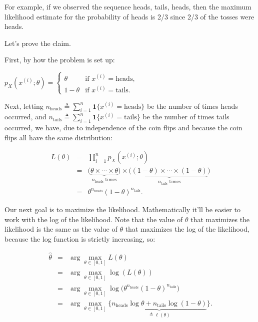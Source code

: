 \documentclass[6008notes.tex]{subfiles}
\begin{document}
For example, if we observed the sequence heads, tails, heads, then the maximum likelihood estimate for the probability of heads is 2/3 since 2/3 of the tosses were heads.

Let's prove the claim.

First, by how the problem is set up:

{\centering$p_{X}(x^{(i)};\theta)=\begin{cases}
\theta & \text{if }x^{(i)}=\text{heads},\\
1-\theta & \text{if }x^{(i)}=\text{tails}.
\end{cases}$ \par}

Next, letting $n_{\text {heads}}\triangleq \sum _{i=1}^{n}\mathbf{1}\{ x^{(i)}=\text {heads}\}$ be the number of times heads occurred, and $n_{\text {tails}}\triangleq \sum _{i=1}^{n}\mathbf{1}\{ x^{(i)}=\text {tails}\}$ be the number of times tails occurred, we have, due to independence of the coin flips and because the coin flips all have the same distribution:

\begin{eqnarray*}
L(\theta)
&=& \prod_{i=1}^{n}p_{X}(x^{(i)};\theta) \\
&=& \big(\underbrace{\theta\times\cdots\times\theta}_{n_{\text{heads}}\text{ times}}\big)\times\big(\underbrace{(1-\theta)\times\cdots\times(1-\theta)}_{n_{\text{tails}}\text{ times}}\big) \\
&=& \theta^{n_{\text{heads}}}(1-\theta)^{n_{\text{tails}}}.
\end{eqnarray*}

Our next goal is to maximize the likelihood. Mathematically it'll be easier to work with the log of the likelihood. Note that the value of $\theta$ that maximizes the likelihood is the same as the value of $\theta$ that maximizes the log of the likelihood, because the log function is strictly increasing, so:

\begin{eqnarray*}
\widehat{\theta} &=&\arg\max_{\theta\in[0,1]} L(\theta) \\
&=&\arg\max_{\theta\in[0,1]}\log( L(\theta) )\\
&=&\arg\max_{\theta\in[0,1]}\log\big(\theta^{n_{\text{heads}}}(1-\theta)^{n_{\text{tails}}}\big)\\
&=&\arg\max_{\theta\in[0,1]}\big\{\underbrace{n_{\text{heads}}\log\theta+n_{\text{tails}}\log(1-\theta)}_{\triangleq\ell(\theta)}\big\}.
\end{eqnarray*}
\end{document}
